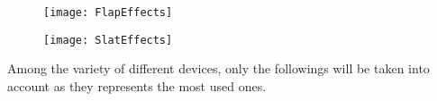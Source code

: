 \begin{figure}
\centering
\begin{minipage}{.5\textwidth}
  \centering
  \texttt{[image: FlapEffects]}
  \label{fig:FlapEffects}
\end{minipage}%
\begin{minipage}{.5\textwidth}
  \centering
  \texttt{[image: SlatEffects]}
  \label{fig:SlatEffects}
\end{minipage}
\label{fig:FlapSlatEffects}
\end{figure}

\noindent
Among the variety of different devices, only the followings will be taken into account as they represents the most used ones.

